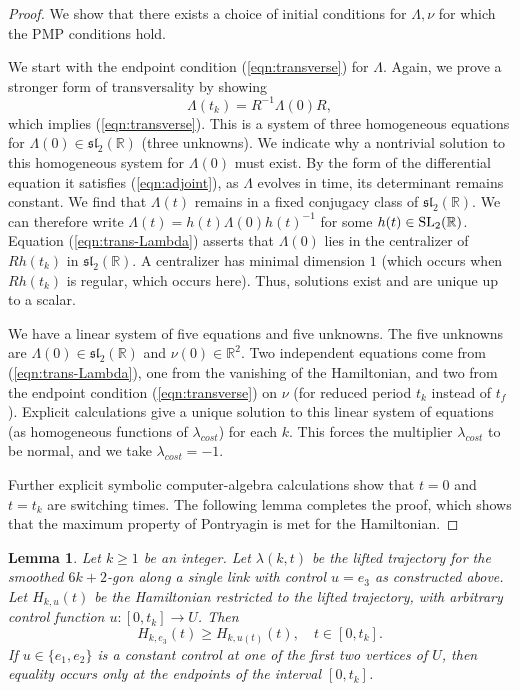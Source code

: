 \documentclass{article}
\newtheorem{lemma}[theorem]{Lemma}
\theoremstyle{remark}
\newcommand{\ring}[1]{\mathbb{#1}}
\newcommand{\op}[1]{\hbox{#1}}
\def\sl{\mathfrak{sl}_2(\ring{R})}
\def\SL{\op{SL}_2(\ring{R})}
\begin{document}
\begin{proof}
We show that there exists a choice of initial conditions for
$\Lambda,\nu$ for which the PMP conditions hold.

We start with the endpoint condition (\ref{eqn:transverse}) for $\Lambda$.
Again, we prove a stronger form of transversality by showing
\begin{equation}\label{eqn:trans-Lambda}
\Lambda(t_k) = R^{-1} \Lambda(0) R,
\end{equation}
which implies (\ref{eqn:transverse}).  This is a system of three
homogeneous equations for $\Lambda(0)\in \sl$ (three unknowns).  We
indicate why a nontrivial solution to this homogeneous system for
$\Lambda(0)$ must exist.  By the form of the differential equation it
satisfies (\ref{eqn:adjoint}), as $\Lambda$ evolves in time, its
determinant remains constant.  We find that $\Lambda(t)$ remains in a
fixed conjugacy class of $\sl$.  We can therefore write $\Lambda(t) =
h(t) \Lambda(0) h(t)^{-1}$ for some $h(t)\in\SL$.  Equation
(\ref{eqn:trans-Lambda}) asserts that $\Lambda(0)$ lies in the
centralizer of $R h(t_k)$ in $\sl$.  A centralizer has minimal
dimension $1$ (which occurs when $R h(t_k)$ is regular, which occurs
here).  Thus, solutions exist and are unique up to a scalar.

We have a linear system of five equations and five unknowns.  The five
unknowns are $\Lambda(0)\in\sl$ and $\nu(0)\in\ring{R}^2$.  Two
independent equations come from (\ref{eqn:trans-Lambda}), one from the
vanishing of the Hamiltonian, and two from the endpoint condition
(\ref{eqn:transverse}) on $\nu$ (for reduced period $t_k$ instead of
$t_f$).  Explicit calculations give a unique solution to this linear
system of equations (as homogeneous functions of $\lambda_{cost}$) for
each $k$.  This forces the multiplier $\lambda_{cost}$ to be normal,
and we take $\lambda_{cost}=-1$.

Further explicit symbolic computer-algebra calculations show that
$t=0$ and $t=t_k$ are switching times.
The following lemma completes the proof, which shows that the
maximum property of Pontryagin is met for the Hamiltonian.
\end{proof}

\begin{lemma}  
  Let $k\ge 1$ be an integer.  Let $\lambda(k,t)$ be the lifted
  trajectory for the smoothed $6k+2$-gon along a single link with control
  $u=e_3$ as constructed above.  Let $H_{k,u}(t)$ be the
  Hamiltonian restricted to the lifted trajectory, with arbitrary control
  function $u:[0,t_k]\to U$.  Then
\[
H_{k,e_3}(t) \ge H_{k,u(t)}(t),\quad t\in [0,t_k].
\]
If $u\in \{e_1,e_2\}$ is a constant control at one of the first two vertices
of $U$, then equality occurs only at the endpoints of the interval $[0,t_k]$.
\end{lemma}
\end{document}
